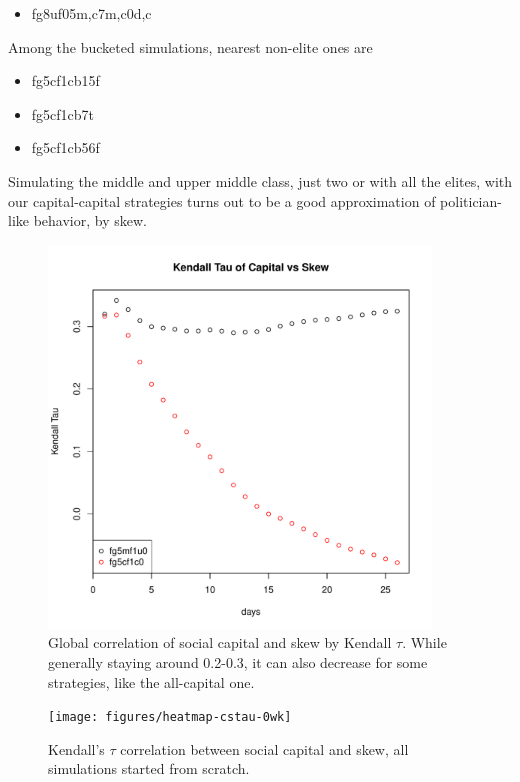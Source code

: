 \documentclass[10pt,oneside]{memoir}
\begin{document}
\begin{Spacing}{2}
\begin{itemize}


\item fg8uf05{m,c7m,c0d,c}
\end{itemize}

Among the bucketed simulations, nearest non-elite ones are


\begin{itemize}


\item fg5cf1cb15f

\item fg5cf1cb7t

\item fg5cf1cb56f
\end{itemize}

Simulating the middle and upper middle class, just two or with all the elites, with our capital-capital strategies turns out to be a good approximation of politician-like behavior, by skew.



\begin{figure}
\begin{center}
    \includegraphics[width=4in]{figures/kendall-tau-fg5mf1u0-fg5cf1c0}
    \caption{Global correlation of social capital and skew by Kendall $\tau$.  While generally staying around 0.2-0.3, it can also decrease for some strategies, like the all-capital one.}
    \label{figure:kendall-tau-fg5mf1u0-fg5cf1c0}
\end{center}
\end{figure}

\begin{figure}
\begin{center}
    \texttt{[image: figures/heatmap-cstau-0wk]}
    \caption{Kendall’s $\tau$ correlation between social capital and skew, all simulations started from scratch.}
    \label{figure:heatmap-cstau-0wk}
\end{center}
\end{figure}


\end{Spacing}
\end{document}
